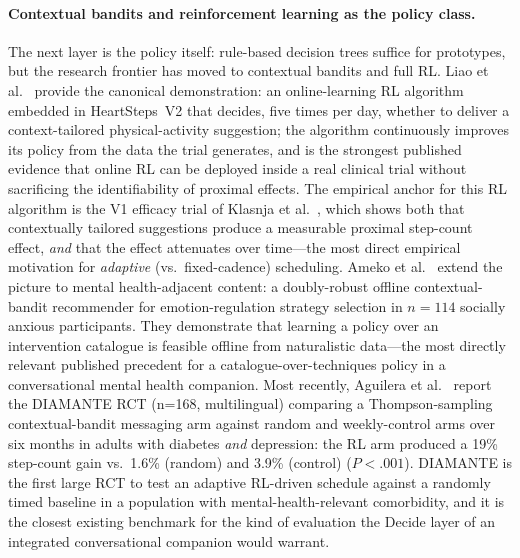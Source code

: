 \documentclass[11pt,a4paper]{article}
\begin{document}
\paragraph{Contextual bandits and reinforcement learning as the policy class.}
The next layer is the policy itself: rule-based decision trees
suffice for prototypes, but the research frontier has moved to
contextual bandits and full RL. Liao et
al.~\cite{Liao2020PersonalizedHeartSteps} provide the canonical
demonstration: an online-learning RL algorithm embedded in
HeartSteps~V2 that decides, five times per day, whether to deliver
a context-tailored physical-activity suggestion; the algorithm
continuously improves its policy from the data the trial
generates, and is the strongest published evidence that online RL
can be deployed inside a real clinical trial without sacrificing
the identifiability of proximal effects. The empirical anchor for
this RL algorithm is the V1 efficacy trial of Klasnja et
al.~\cite{Klasnja2018HeartStepsMRT}, which shows both that
contextually tailored suggestions produce a measurable proximal
step-count effect, \emph{and} that the effect attenuates over
time---the most direct empirical motivation for \emph{adaptive}
(vs.\ fixed-cadence) scheduling. Ameko et
al.~\cite{Ameko2020CMABEmotion} extend the picture to mental
health-adjacent content: a doubly-robust offline contextual-bandit
recommender for emotion-regulation strategy selection in $n\!=\!114$
socially anxious participants. They demonstrate that learning a
policy over an intervention catalogue is feasible offline from
naturalistic data---the most directly relevant published precedent
for a catalogue-over-techniques policy in a conversational mental
health companion. Most recently, Aguilera et
al.~\cite{Aguilera2024DIAMANTERL} report the DIAMANTE RCT
(n=168, multilingual) comparing a Thompson-sampling
contextual-bandit messaging arm against random and weekly-control
arms over six months in adults with diabetes \emph{and} depression:
the RL arm produced a 19\% step-count gain vs.\ 1.6\% (random) and
3.9\% (control) ($P\!<\!.001$). DIAMANTE is the first large RCT to
test an adaptive RL-driven schedule against a randomly timed
baseline in a population with mental-health-relevant comorbidity,
and it is the closest existing benchmark for the kind of evaluation
the Decide layer of an integrated conversational companion would
warrant.
\end{document}

